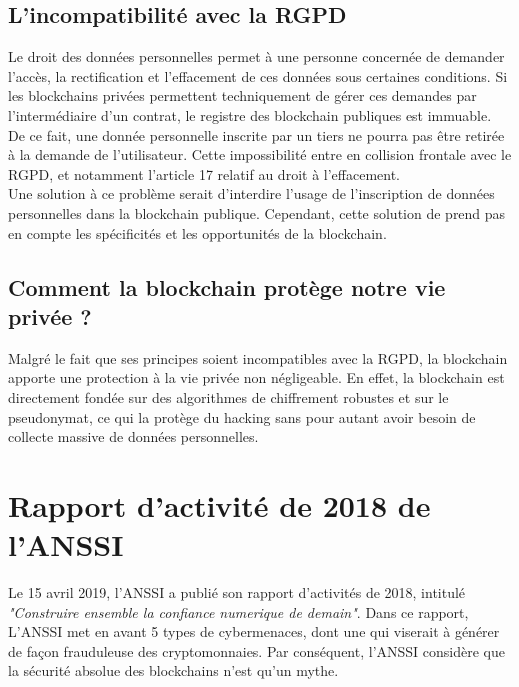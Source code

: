 \documentclass[12pt, a4paper, oneside]{book}
\begin{document}
    \subsection{L'incompatibilité avec la RGPD}
    Le droit des données personnelles permet 
    à une personne concernée de demander l’accès, la rectification 
    et l’effacement de ces données sous certaines conditions. 
    Si les blockchains privées permettent techniquement de gérer
    ces demandes par l’intermédiaire d’un contrat,
    le registre des blockchain publiques est immuable. De ce fait,
    une donnée personnelle inscrite par un tiers ne pourra pas être retirée 
    à la demande de l’utilisateur. Cette impossibilité entre en collision frontale avec le RGPD, 
    et notamment l’article 17 relatif au droit à l’effacement. 
    \\ 
    \newline
    Une solution à ce problème serait d'interdire l'usage de l'inscription de données personnelles dans la blockchain publique. 
    Cependant, cette solution de prend pas en compte les spécificités et les opportunités de la blockchain.
    \cite{reg}

    \subsection{Comment la blockchain protège notre vie privée ?}

    Malgré le fait que ses principes 
     soient incompatibles avec la RGPD, la blockchain apporte une protection à la vie privée non négligeable. 
     En effet, la blockchain est directement fondée sur des algorithmes de chiffrement robustes et sur le pseudonymat,
     ce qui la protège du hacking sans pour autant avoir besoin de collecte massive de données personnelles.
     \cite{reg}

    \section{Rapport d'activité de 2018 de l'ANSSI}

    Le 15 avril 2019, l'ANSSI a publié son rapport d'activités de 2018, intitulé \textit{"Construire ensemble la confiance 
    numerique de demain"}. 
    Dans ce rapport, L'ANSSI met en avant 5 types de cybermenaces, dont une qui viserait à générer de façon frauduleuse des 
    cryptomonnaies. Par conséquent, l'ANSSI considère que la sécurité absolue des blockchains n'est qu'un mythe.
    \cite{anssi2018}
\end{document}
